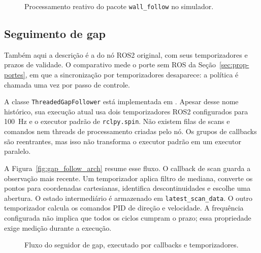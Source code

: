 \begin{figure}[htb]
\centering
{}
\caption{Processamento reativo do pacote \texttt{wall\_follow} no simulador.}
\label{fig:wall_follow_arch}\label{fig:wall_follow_flow}
\end{figure}

\subsection{Seguimento de gap}

Também aqui a descrição é a do nó ROS2 original, com seus temporizadores e prazos
de validade. O comparativo mede o porte sem ROS da Seção~\ref{sec:prop-portes},
em que a sincronização por temporizadores desaparece: a política é chamada uma
vez por passo de controle.

A classe \texttt{ThreadedGapFollower} está implementada em
. Apesar desse nome histórico, sua execução atual
usa dois temporizadores ROS2 configurados para 100~Hz e o executor padrão de
\texttt{rclpy.spin}. Não existem filas de scans e comandos nem threads de
processamento criadas pelo nó. Os grupos de callbacks são reentrantes, mas
isso não transforma o executor padrão em um executor paralelo.

A Figura~\ref{fig:gap_follow_arch} resume esse fluxo. O callback de scan guarda a
observação mais recente. Um temporizador aplica
filtro de mediana, converte os pontos para coordenadas cartesianas, identifica
descontinuidades e escolhe uma abertura. O estado intermediário é armazenado
em \texttt{latest\_scan\_data}. O outro temporizador calcula os comandos PID
de direção e velocidade. A frequência configurada não implica que todos os
ciclos cumpram o prazo; essa propriedade exige medição durante a execução.

\begin{figure}[htb]
\centering
{}
\caption{Fluxo do seguidor de gap, executado por callbacks e temporizadores.}
\label{fig:gap_follow_arch}\label{fig:gap_follow_flow}
\end{figure}

